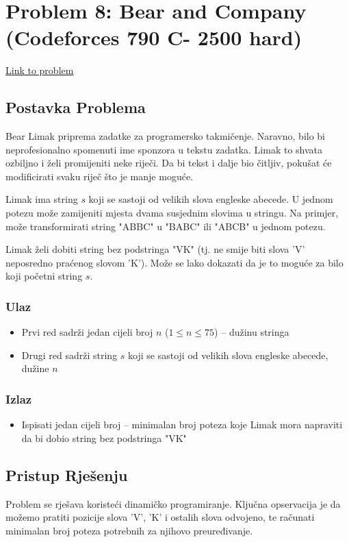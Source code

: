 \section{Problem 8: Bear and Company (Codeforces 790 C- 2500 hard)}
\href{https://codeforces.com/contest/790/problem/C/}{Link to problem}

\subsection{Postavka Problema}
Bear Limak priprema zadatke za programersko takmičenje. Naravno, bilo bi neprofesionalno spomenuti ime sponzora u tekstu zadatka. Limak to shvata ozbiljno i želi promijeniti neke riječi. Da bi tekst i dalje bio čitljiv, pokušat će modificirati svaku riječ što je manje moguće.

Limak ima string $s$ koji se sastoji od velikih slova engleske abecede. U jednom potezu može zamijeniti mjesta dvama susjednim slovima u stringu. Na primjer, može transformirati string "ABBC" u "BABC" ili "ABCB" u jednom potezu.

Limak želi dobiti string bez podstringa "VK" (tj. ne smije biti slova 'V' neposredno praćenog slovom 'K'). Može se lako dokazati da je to moguće za bilo koji početni string $s$.

\subsubsection{Ulaz}
\begin{itemize}
    \item Prvi red sadrži jedan cijeli broj $n$ ($1 \leq n \leq 75$) -- dužinu stringa
    \item Drugi red sadrži string $s$ koji se sastoji od velikih slova engleske abecede, dužine $n$
\end{itemize}

\subsubsection{Izlaz}
\begin{itemize}
    \item Ispisati jedan cijeli broj -- minimalan broj poteza koje Limak mora napraviti da bi dobio string bez podstringa "VK"
\end{itemize}

\subsection{Pristup Rješenju}
Problem se rješava koristeći dinamičko programiranje. Ključna opservacija je da možemo pratiti pozicije slova 'V', 'K' i ostalih slova odvojeno, te računati minimalan broj poteza potrebnih za njihovo preuređivanje.

